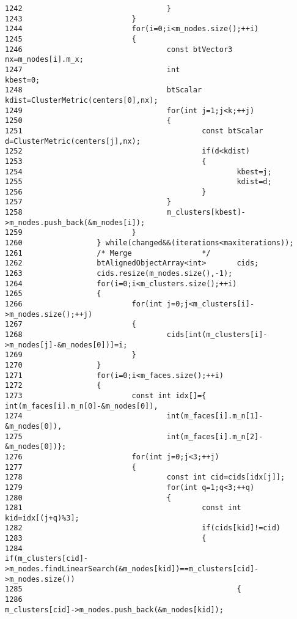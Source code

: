 \begin{Code}
\begin{verbatim}
1242                                 }                       
1243                         }
1244                         for(i=0;i<m_nodes.size();++i)
1245                         {
1246                                 const btVector3 nx=m_nodes[i].m_x;
1247                                 int                             kbest=0;
1248                                 btScalar                kdist=ClusterMetric(centers[0],nx);
1249                                 for(int j=1;j<k;++j)
1250                                 {
1251                                         const btScalar  d=ClusterMetric(centers[j],nx);
1252                                         if(d<kdist)
1253                                         {
1254                                                 kbest=j;
1255                                                 kdist=d;
1256                                         }
1257                                 }
1258                                 m_clusters[kbest]->m_nodes.push_back(&m_nodes[i]);
1259                         }               
1260                 } while(changed&&(iterations<maxiterations));
1261                 /* Merge                */ 
1262                 btAlignedObjectArray<int>       cids;
1263                 cids.resize(m_nodes.size(),-1);
1264                 for(i=0;i<m_clusters.size();++i)
1265                 {
1266                         for(int j=0;j<m_clusters[i]->m_nodes.size();++j)
1267                         {
1268                                 cids[int(m_clusters[i]->m_nodes[j]-&m_nodes[0])]=i;
1269                         }
1270                 }
1271                 for(i=0;i<m_faces.size();++i)
1272                 {
1273                         const int idx[]={       int(m_faces[i].m_n[0]-&m_nodes[0]),
1274                                 int(m_faces[i].m_n[1]-&m_nodes[0]),
1275                                 int(m_faces[i].m_n[2]-&m_nodes[0])};
1276                         for(int j=0;j<3;++j)
1277                         {
1278                                 const int cid=cids[idx[j]];
1279                                 for(int q=1;q<3;++q)
1280                                 {
1281                                         const int kid=idx[(j+q)%3];
1282                                         if(cids[kid]!=cid)
1283                                         {
1284                                                 if(m_clusters[cid]->m_nodes.findLinearSearch(&m_nodes[kid])==m_clusters[cid]->m_nodes.size())
1285                                                 {
1286                                                         m_clusters[cid]->m_nodes.push_back(&m_nodes[kid]);

\end{verbatim}
\end{Code}
